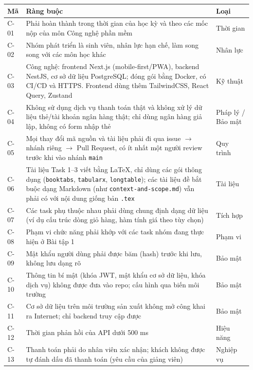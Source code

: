 {\small\renewcommand{\arraystretch}{1.25}
\begin{tabularx}{\linewidth}{@{}l X l@{}}
\toprule
\textbf{Mã} & \textbf{Ràng buộc} & \textbf{Loại} \\
\midrule
C-01 & Phải hoàn thành trong thời gian của học kỳ và theo các mốc nộp của môn Công nghệ phần mềm & Thời gian \\
C-02 & Nhóm phát triển là sinh viên, nhân lực hạn chế, làm song song với các môn học khác & Nhân lực \\
C-03 & Công nghệ: frontend Next.js (mobile-first/PWA), backend NestJS, cơ sở dữ liệu PostgreSQL; đóng gói bằng Docker, có CI/CD và HTTPS. Frontend dùng thêm TailwindCSS, React Query, Zustand & Kỹ thuật \\
C-04 & Không sử dụng dịch vụ thanh toán thật và không xử lý dữ liệu thẻ/tài khoản ngân hàng thật; chỉ dùng ngân hàng giả lập, không có form nhập thẻ & Pháp lý / Bảo mật \\
C-05 & Mọi thay đổi mã nguồn và tài liệu phải đi qua issue $\rightarrow$ nhánh riêng $\rightarrow$ Pull Request, có ít nhất một người review trước khi vào nhánh \texttt{main} & Quy trình \\
C-06 & Tài liệu Task 1--3 viết bằng LaTeX, chỉ dùng các gói thông dụng (\texttt{booktabs}, \texttt{tabularx}, \texttt{longtable}); các tài liệu đề bắt buộc dạng Markdown (như \texttt{context-and-scope.md}) vẫn phải có với nội dung giống bản \texttt{.tex} & Tài liệu \\
C-07 & Các task phụ thuộc nhau phải dùng chung định dạng dữ liệu (ví dụ cấu trúc dòng giỏ hàng, hàm tính giá theo tùy chọn) & Tích hợp \\
C-08 & Phạm vi chức năng phải khớp với các task nhóm đang thực hiện ở Bài tập 1 & Phạm vi \\
C-09 & Mật khẩu người dùng phải được băm (hash) trước khi lưu, không lưu dạng rõ & Bảo mật \\
C-10 & Thông tin bí mật (khóa JWT, mật khẩu cơ sở dữ liệu, khóa dịch vụ) không được đưa vào repo; cấu hình qua biến môi trường & Bảo mật \\
C-11 & Cơ sở dữ liệu trên môi trường sản xuất không mở công khai ra Internet; chỉ backend truy cập được & Bảo mật \\
C-12 & Thời gian phản hồi của API dưới 500 ms & Hiệu năng \\
C-13 & Thanh toán phải do nhân viên xác nhận; khách không được tự đánh dấu đã thanh toán (yêu cầu của giảng viên) & Nghiệp vụ \\
\bottomrule
\end{tabularx}}

